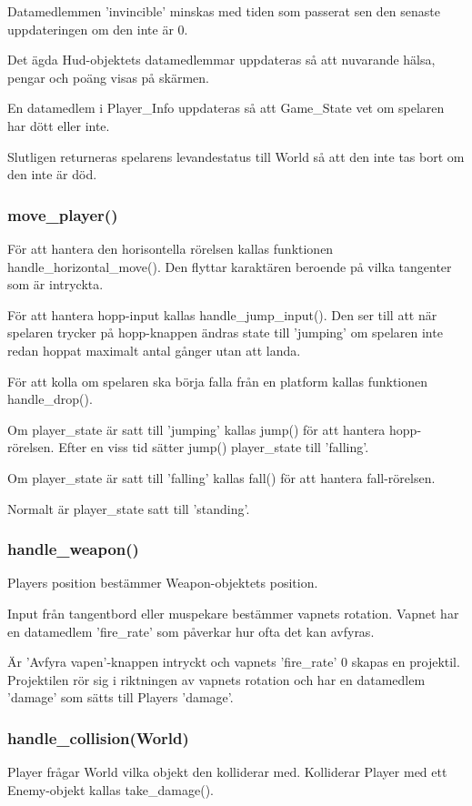 \documentclass{TDP005mall}
\begin{document}
Datamedlemmen 'invincible' minskas med tiden som passerat sen den senaste uppdateringen om den inte är 0.

Det ägda Hud-objektets datamedlemmar uppdateras så att nuvarande hälsa, pengar och poäng visas på skärmen. 

En datamedlem i Player\_Info uppdateras så att Game\_State vet om spelaren har dött eller inte.

Slutligen returneras spelarens levandestatus till World så att den inte tas bort om den inte är död.

\subsubsection{move\_player()}
För att hantera den horisontella rörelsen kallas funktionen handle\_horizontal\_move().
Den flyttar karaktären beroende på vilka tangenter som är intryckta.

För att hantera hopp-input kallas handle\_jump\_input().
Den ser till att när spelaren trycker på hopp-knappen ändras state till 'jumping' om spelaren inte redan hoppat maximalt antal gånger utan att landa. 

För att kolla om spelaren ska börja falla från en platform kallas funktionen handle\_drop().

Om player\_state är satt till 'jumping' kallas jump() för att hantera hopp-rörelsen.
Efter en viss tid sätter jump() player\_state till 'falling'.

Om player\_state är satt till 'falling' kallas fall() för att hantera fall-rörelsen.

Normalt är player\_state satt till 'standing'. 


\subsubsection{handle\_weapon()}
Players position bestämmer Weapon-objektets position. 

Input från tangentbord eller muspekare bestämmer vapnets rotation.
Vapnet har en datamedlem 'fire\_rate' som påverkar hur ofta det kan avfyras. 

Är 'Avfyra vapen'-knappen intryckt och vapnets 'fire\_rate' 0 skapas en projektil.
Projektilen rör sig i riktningen av vapnets rotation och har en datamedlem 'damage' som sätts till Players 'damage'.

\subsubsection{handle\_collision(World)}
Player frågar World vilka objekt den kolliderar med. Kolliderar Player med ett Enemy-objekt kallas take\_damage().
\end{document}
